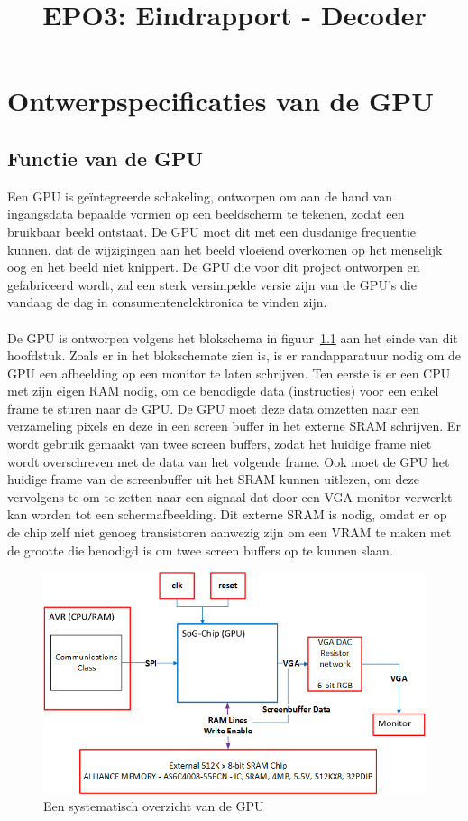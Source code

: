\documentclass{scrartcl} %
\author{}
\title{EPO3: Eindrapport - Decoder}
\begin{document}
\chapter{Ontwerpspecificaties van de GPU}
\label{ch:spec}

\section {Functie van de GPU}
Een GPU is geïntegreerde schakeling, ontworpen om aan de hand van ingangsdata bepaalde vormen op een beeldscherm te tekenen, zodat een bruikbaar beeld ontstaat. De GPU moet dit met een dusdanige frequentie kunnen, dat de wijzigingen aan het beeld vloeiend overkomen op het menselijk oog en het beeld niet knippert. De GPU die voor dit project ontworpen en gefabriceerd wordt, zal een sterk versimpelde versie zijn van de GPU's die vandaag de dag in consumentenelektronica te vinden zijn.
\\\\
De GPU is ontworpen volgens het blokschema in figuur~\ref{fig:spec-overzicht} aan het einde van dit hoofdstuk.
Zoals er in het blokschemate zien is, is er randapparatuur nodig om de GPU een afbeelding op een monitor te laten schrijven. Ten eerste is er een CPU met zijn eigen RAM nodig, om de benodigde data (instructies) voor een enkel frame te sturen naar de GPU. De GPU moet deze data omzetten naar een verzameling pixels en deze in een screen buffer in het externe SRAM schrijven. Er wordt gebruik gemaakt van twee screen buffers, zodat het huidige frame niet wordt overschreven met de data van het volgende frame. Ook moet de GPU het huidige frame van de screenbuffer uit het SRAM kunnen uitlezen, om deze vervolgens te om te zetten naar een signaal dat door een VGA monitor verwerkt kan worden tot een schermafbeelding. Dit externe SRAM is nodig, omdat er op de chip zelf niet genoeg transistoren aanwezig zijn om een VRAM te maken met de grootte die benodigd is om twee screen buffers op te kunnen slaan.

\begin{figure}[H]
\centering
	\includegraphics[scale=0.9]{Resource/system_overview.png}
	\caption{Een systematisch overzicht van de GPU}
	\label{fig:spec-overzicht}
\end{figure} 
\end{document}
